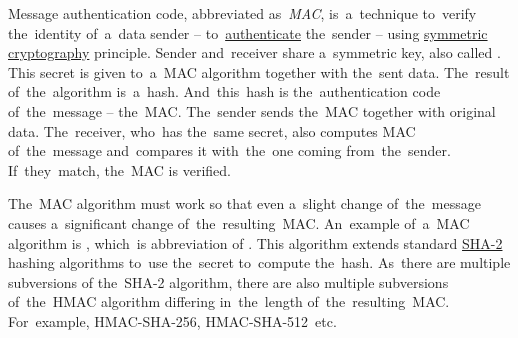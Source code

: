 \label{mac}
Message authentication code, abbreviated \mbox{as \textit{MAC}}, is~a~technique to~verify the~identity of~a~data sender -- to~\hyperref[authenticationauthorization]{authenticate} the~sender -- using \hyperref[symmetriccryptography]{symmetric cryptography} principle.
Sender and~receiver share a~symmetric key, also called .
This secret is given to~a~MAC algorithm together with the~sent data.
The~result of~the~algorithm is~a~hash.
And~this~hash is the~authentication code of~the~message -- the~MAC\@.
The~sender sends the~MAC together with original data.
The~receiver, who~has the~same secret, also computes MAC of~the~message and~compares it with~the~one coming from~the~sender.
If~they~match, the~MAC is verified.

The~MAC algorithm must work so that even a~slight change of~the~message causes a~significant change of~the~resulting~MAC\@.
An~example of~a~MAC algorithm is , which~is abbreviation of .
This algorithm extends standard \hyperref[sha]{\mbox{SHA-2}} hashing algorithms to~use the~secret to~compute the~hash.
As~there are multiple subversions of \mbox{the SHA-2} algorithm, there are also multiple subversions of~the~HMAC algorithm differing in~the~length of~the~resulting~MAC\@.
For~example, \mbox{HMAC-SHA-256,} \mbox{HMAC-SHA-512 etc.}
